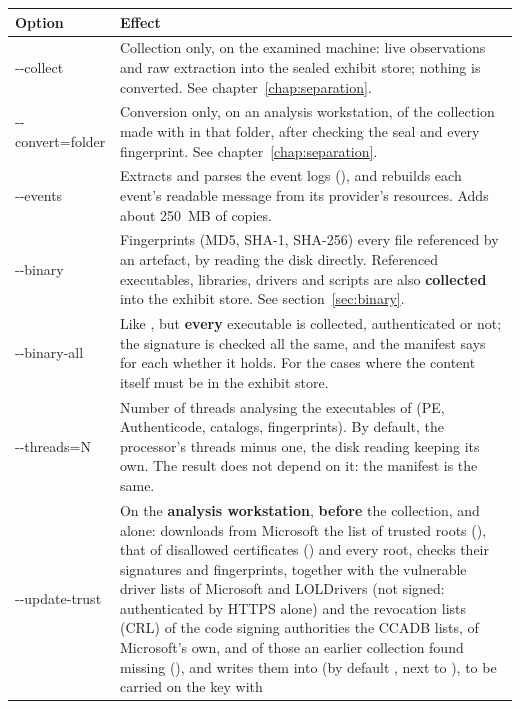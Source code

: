 \documentclass[11pt,a4paper,oneside]{report}
\begin{document}
\begin{longtable}{@{}>{\ttfamily}L{3.2cm}L{11.2cm}@{}}
\toprule
\normalfont\bfseries Option & \bfseries Effect \\
\midrule
\endhead
-{}-collect & Collection only, on the examined machine: live observations and
  raw extraction into the sealed exhibit store; nothing is converted. See
  chapter~\ref{chap:separation}. \\
-{}-convert=folder & Conversion only, on an analysis workstation, of the
  collection made with  in that folder, after checking the seal
  and every fingerprint. See chapter~\ref{chap:separation}. \\
-{}-events & Extracts and parses the event logs (), and rebuilds
  each event's readable message from its provider's resources. Adds about
  250~MB of copies. \\
-{}-binary & Fingerprints (MD5, SHA-1, SHA-256) every file referenced by an
  artefact, by reading the disk directly. Referenced executables, libraries,
  drivers and scripts are also \textbf{collected} into the exhibit store. See
  section~\ref{sec:binary}. \\
-{}-binary-all & Like , but \textbf{every} executable is collected,
  authenticated or not; the signature is checked all the same, and the manifest
  says for each whether it holds. For the cases where the content itself must
  be in the exhibit store. \\
-{}-threads=N & Number of threads analysing the executables of 
   (PE, Authenticode, catalogs, fingerprints). By default, the
  processor's threads minus one, the disk reading keeping its own. The result
  does not depend on it: the manifest is the same. \\
-{}-update-trust\newline [=folder] & On the \textbf{analysis workstation}, \textbf{before} the
  collection, and alone: downloads from Microsoft the list of trusted roots
  (), that of disallowed certificates
  () and every root, checks their signatures and
  fingerprints, together with the vulnerable driver lists of Microsoft and
  LOLDrivers (not signed: authenticated by HTTPS alone) and the revocation
  lists (CRL) of the code signing authorities the CCADB lists, of Microsoft's
  own, and of those an earlier collection found missing
  (), and writes them into  (by default
  , next to ), to be carried on the key with

\end{longtable}
\end{document}
